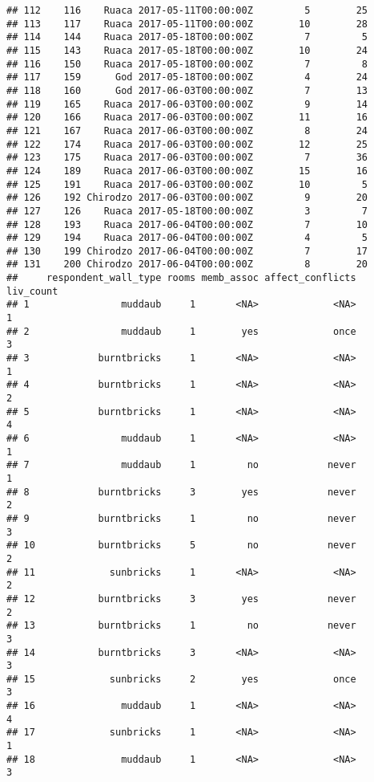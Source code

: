 \documentclass[
]{article}
\begin{document}
\begin{verbatim}
## 112    116    Ruaca 2017-05-11T00:00:00Z         5        25
## 113    117    Ruaca 2017-05-11T00:00:00Z        10        28
## 114    144    Ruaca 2017-05-18T00:00:00Z         7         5
## 115    143    Ruaca 2017-05-18T00:00:00Z        10        24
## 116    150    Ruaca 2017-05-18T00:00:00Z         7         8
## 117    159      God 2017-05-18T00:00:00Z         4        24
## 118    160      God 2017-06-03T00:00:00Z         7        13
## 119    165    Ruaca 2017-06-03T00:00:00Z         9        14
## 120    166    Ruaca 2017-06-03T00:00:00Z        11        16
## 121    167    Ruaca 2017-06-03T00:00:00Z         8        24
## 122    174    Ruaca 2017-06-03T00:00:00Z        12        25
## 123    175    Ruaca 2017-06-03T00:00:00Z         7        36
## 124    189    Ruaca 2017-06-03T00:00:00Z        15        16
## 125    191    Ruaca 2017-06-03T00:00:00Z        10         5
## 126    192 Chirodzo 2017-06-03T00:00:00Z         9        20
## 127    126    Ruaca 2017-05-18T00:00:00Z         3         7
## 128    193    Ruaca 2017-06-04T00:00:00Z         7        10
## 129    194    Ruaca 2017-06-04T00:00:00Z         4         5
## 130    199 Chirodzo 2017-06-04T00:00:00Z         7        17
## 131    200 Chirodzo 2017-06-04T00:00:00Z         8        20
##     respondent_wall_type rooms memb_assoc affect_conflicts liv_count
## 1                muddaub     1       <NA>             <NA>         1
## 2                muddaub     1        yes             once         3
## 3            burntbricks     1       <NA>             <NA>         1
## 4            burntbricks     1       <NA>             <NA>         2
## 5            burntbricks     1       <NA>             <NA>         4
## 6                muddaub     1       <NA>             <NA>         1
## 7                muddaub     1         no            never         1
## 8            burntbricks     3        yes            never         2
## 9            burntbricks     1         no            never         3
## 10           burntbricks     5         no            never         2
## 11             sunbricks     1       <NA>             <NA>         2
## 12           burntbricks     3        yes            never         2
## 13           burntbricks     1         no            never         3
## 14           burntbricks     3       <NA>             <NA>         3
## 15             sunbricks     2        yes             once         3
## 16               muddaub     1       <NA>             <NA>         4
## 17             sunbricks     1       <NA>             <NA>         1
## 18               muddaub     1       <NA>             <NA>         3

\end{verbatim}
\end{document}

